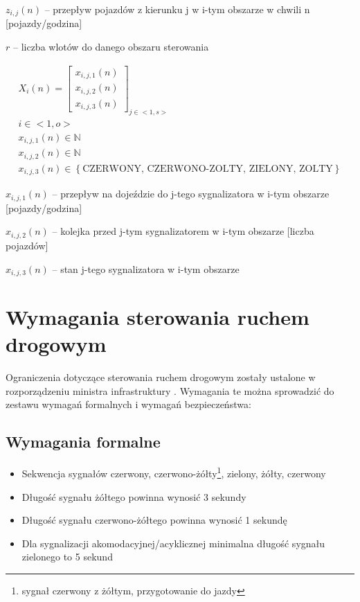 \begin{math} z_{i,j} (n) \end{math} \textrm{ -- przepływ pojazdów z kierunku j w i-tym obszarze w chwili n [pojazdy/godzina]}

\begin{math} r \end{math} -- liczba wlotów do danego obszaru sterowania

\begin{equation}
	\begin{array}{c}
		X_i (n) = \left[
			\begin{array}{c}
				x_{i, j, 1} (n) \\ x_{i, j, 2} (n) \\ x_{i, j, 3} (n)
			\end{array}
		\right]_{j \in <1,s>}\\
		i \in <1,o>\\
		x_{i, j, 1} (n) \in \mathbb{N}\\
		x_{i, j, 2} (n) \in \mathbb{N}\\
		x_{i, j, 3} (n) \in \left\{ \textrm{CZERWONY, CZERWONO-ZOLTY, ZIELONY, ZOLTY} \right\}
	\end{array}
\end{equation}

\begin{math} x_{i, j, 1} (n) \end{math} \textrm{ -- przepływ na dojeździe do j-tego sygnalizatora w i-tym obszarze [pojazdy/godzina]}

\begin{math} x_{i, j, 2} (n) \end{math} \textrm{ -- kolejka przed j-tym sygnalizatorem w i-tym obszarze [liczba pojazdów]}

\begin{math} x_{i, j, 3} (n) \end{math} \textrm{ -- stan j-tego sygnalizatora w i-tym obszarze}

\section{Wymagania sterowania ruchem drogowym}
\label{sec:model_ograniczenia}
Ograniczenia dotyczące sterowania ruchem drogowym zostały ustalone w rozporządzeniu ministra infrastruktury \cite{rozporzadzenie}. Wymagania te można sprowadzić do zestawu wymagań formalnych i wymagań bezpieczeństwa:
\subsection{Wymagania formalne}
\begin{itemize}
	\item Sekwencja sygnałów czerwony, czerwono-żółty\footnote{sygnał czerwony z żółtym, przygotowanie do jazdy}, zielony, żółty, czerwony
	\item Długość sygnału żółtego powinna wynosić 3 sekundy
	\item Długość sygnału czerwono-żółtego powinna wynosić 1 sekundę
	\item Dla sygnalizacji akomodacyjnej/acyklicznej minimalna długość sygnału zielonego to 5 sekund
\end{itemize}


